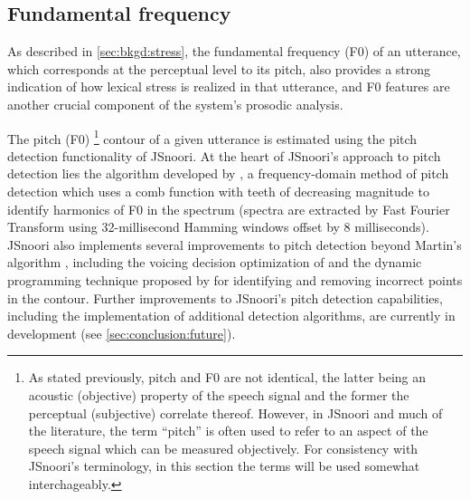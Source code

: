 	\subsection{Fundamental frequency}
	\label{sec:prosody:f0}
	
	
	As described in \cref{sec:bkgd:stress}, the fundamental frequency (F0) of an utterance, which corresponds at the perceptual level to its pitch, also provides a strong indication of how lexical stress is realized in that utterance, and F0 features 
	are another crucial component of
	the system's prosodic analysis. 
	
	
	The pitch (F0)%
	\footnote{ As stated previously, pitch and F0 are not identical, 
	the latter being an acoustic (objective) property of the speech signal and the former the perceptual (subjective) correlate thereof. 
	However, in JSnoori and much of the literature, the term ``pitch'' is often used to refer to an aspect of the speech signal which can be measured objectively.
	For consistency with JSnoori's terminology, in this section the terms will be used somewhat interchageably.}
	 contour of a given utterance is estimated using the pitch detection 
	functionality of 
	JSnoori. At the heart of JSnoori's approach to pitch detection lies the algorithm developed by \textcite{Martin1982}, a frequency-domain method of pitch detection which uses a comb function with teeth of decreasing magnitude to identify harmonics of F0 in the spectrum (spectra are extracted by Fast Fourier Transform using 32-millisecond Hamming windows offset by 8 milliseconds). JSnoori also implements several improvements to pitch detection beyond Martin's algorithm \citep{DiMartino1999}, including
	 the voicing decision optimization of   \textcite{Secrest1983} 
	 and the dynamic programming technique proposed by \textcite{Ney1981} for identifying and removing incorrect points in the contour. Further improvements to JSnoori's pitch detection capabilities, including the implementation of additional detection algorithms, are currently in development (see \cref{sec:conclusion:future}).
	
